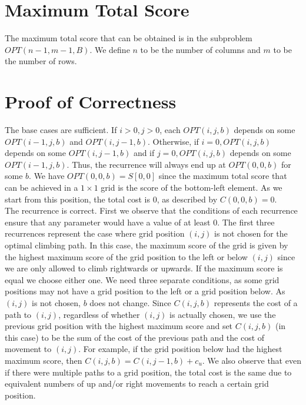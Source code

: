 \documentclass{article}
\begin{document}
    \section*{Maximum Total Score}
    The maximum total score that can be obtained is in the subproblem $OPT(n-1, m-1, B)$. We define $n$ to be the number of columns and $m$ to be the number of rows.
   
    \section*{Proof of Correctness}
    The base cases are sufficient. If $i > 0, j > 0$, each $OPT(i,j,b)$ depends on some $OPT(i-1,j,b)$ and $OPT(i,j-1,b)$. Otherwise, if $i = 0, OPT(i,j,b)$ depends on some $OPT(i,j-1,b)$ and if $j=0, OPT(i,j,b)$ depends on some $OPT(i-1,j,b)$. Thus, the recurrence will always end up at $OPT(0,0,b)$ for some $b$. We have $OPT(0,0,b) = S[0,0]$ since the maximum total score that can be achieved in a $1 \times 1$ grid is the score of the bottom-left element. As we start from this position, the total cost is 0, as described by $C(0,0,b) = 0$. 
    \\
    
    The recurrence is correct. First we observe that the conditions of each recurrence ensure that any parameter would have a value of at least 0. The first three recurrences represent the case where grid position $(i,j)$ is not chosen for the optimal climbing path. In this case, the maximum score of the grid is given by the highest maximum score of the grid position to the left or below $(i,j)$ since we are only allowed to climb rightwards or upwards. If the maximum score is equal we choose either one. We need three separate conditions, as some grid positions may not have a grid position to the left or a grid position below. As $(i,j)$ is not chosen, $b$ does not change. Since $C(i,j,b)$ represents the cost of a path to $(i,j)$, regardless of whether $(i,j)$ is actually chosen, we use the previous grid position with the highest maximum score and set $C(i,j,b)$ (in this case) to be the sum of the cost of the previous path and the cost of movement to $(i,j)$. For example, if the grid position below had the highest maximum score, then $C(i,j,b) = C(i,j-1,b) + c_u$. We also observe that even if there were multiple paths to a grid position, the total cost is the same due to equivalent numbers of up and/or right movements to reach a certain grid position.
    \\
    
\end{document}
